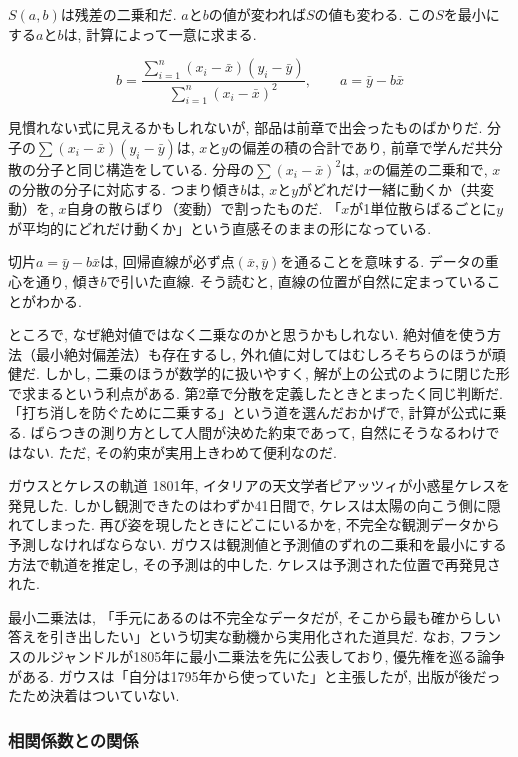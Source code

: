$S(a, b)$は残差の二乗和だ.
$a$と$b$の値が変われば$S$の値も変わる.
この$S$を最小にする$a$と$b$は, 計算によって一意に求まる.

\[
  b = \frac{\displaystyle\sum_{i=1}^{n}(x_i - \bar{x})(y_i - \bar{y})}{\displaystyle\sum_{i=1}^{n}(x_i - \bar{x})^2}, \qquad a = \bar{y} - b\bar{x}
\]

見慣れない式に見えるかもしれないが, 部品は前章で出会ったものばかりだ.
分子の$\sum(x_i - \bar{x})(y_i - \bar{y})$は, $x$と$y$の偏差の積の合計であり, 前章で学んだ共分散の分子と同じ構造をしている.
分母の$\sum(x_i - \bar{x})^2$は, $x$の偏差の二乗和で, $x$の分散の分子に対応する.
つまり傾き$b$は, $x$と$y$がどれだけ一緒に動くか（共変動）を, $x$自身の散らばり（変動）で割ったものだ.
「$x$が1単位散らばるごとに$y$が平均的にどれだけ動くか」という直感そのままの形になっている.

切片$a = \bar{y} - b\bar{x}$は, 回帰直線が必ず点$(\bar{x}, \bar{y})$を通ることを意味する.
データの重心を通り, 傾き$b$で引いた直線.
そう読むと, 直線の位置が自然に定まっていることがわかる.

ところで, なぜ絶対値ではなく二乗なのかと思うかもしれない.
絶対値を使う方法（最小絶対偏差法）も存在するし, 外れ値に対してはむしろそちらのほうが頑健だ.
しかし, 二乗のほうが数学的に扱いやすく, 解が上の公式のように閉じた形で求まるという利点がある.
第2章で分散を定義したときとまったく同じ判断だ.
「打ち消しを防ぐために二乗する」という道を選んだおかげで, 計算が公式に乗る.
ばらつきの測り方として人間が決めた約束であって, 自然にそうなるわけではない.
ただ, その約束が実用上きわめて便利なのだ.

\begin{mybox}{ガウスとケレスの軌道}
1801年, イタリアの天文学者ピアッツィが小惑星ケレスを発見した.
しかし観測できたのはわずか41日間で, ケレスは太陽の向こう側に隠れてしまった.
再び姿を現したときにどこにいるかを, 不完全な観測データから予測しなければならない.
ガウスは観測値と予測値のずれの二乗和を最小にする方法で軌道を推定し, その予測は的中した.
ケレスは予測された位置で再発見された.

最小二乗法は, 「手元にあるのは不完全なデータだが, そこから最も確からしい答えを引き出したい」という切実な動機から実用化された道具だ.
なお, フランスのルジャンドルが1805年に最小二乗法を先に公表しており, 優先権を巡る論争がある.
ガウスは「自分は1795年から使っていた」と主張したが, 出版が後だったため決着はついていない.
\end{mybox}


\subsubsection*{相関係数との関係}

